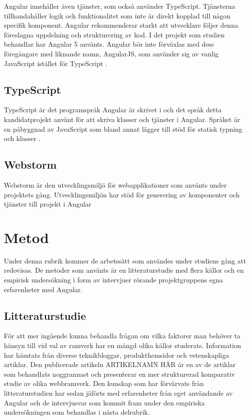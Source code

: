 Angular innehåller även tjänster, som också använder TypeScript. Tjänsterna tillhandahåller logik och funktionalitet som inte är direkt kopplad till någon specifik komponent. Angular rekommenderar starkt att utvecklare följer denna föreslagna uppdelning och strukturering av kod. I det projekt som studien behandlar har Angular 5 använts. Angular bör inte förväxlas med dess föregångare med liknande namn, AngularJS, som använder sig av vanlig JavaScript istället för TypeScript \cite{angularguide}.


\subsection{TypeScript}

TypeScript är det programspråk Angular är skrivet i och det språk detta kandidatprojekt använt för att skriva klasser och tjänster i Angular. Språket är en påbyggnad av JavaScript som bland annat lägger till stöd för statisk typning och klasser \cite{typescript}.

\subsection{Webstorm}

Webstorm är den utvecklingsmiljö för webapplikationer som använts under projektets gång. Utvecklingsmiljön har stöd för generering av komponenter och tjänster till projekt i Angular 



\section{Metod}

Under denna rubrik kommer de arbetssätt som användes under studiens gång att redovisas. De metoder som använts är en litteraturstudie med flera källor och en empirisk undersökning i form av intervjuer rörande projektgruppens egna erfarenheter med Angular.

\subsection{Litteraturstudie}

För att mer ingående kunna behandla frågan om vilka faktorer man behöver ta hänsyn till vid val av ramverk har en mängd olika källor studerats. Information har hämtats från diverse teknikbloggar, produkthemsidor och vetenskapliga artiklar. Den publicerade artikeln ARTIKELNAMN HÄR är en av de artiklar som behandlats noggrannast och presenterar en mer strukturerad komparativ studie av olika webbramverk. Den kunskap som har förvärvats från litteraturstudien har sedan jäförts med erfarenheter från eget användande av Angular och de intervjusvar som kommit fram under den empiriska undersökningen som behandlas i nästa delrubrik.

